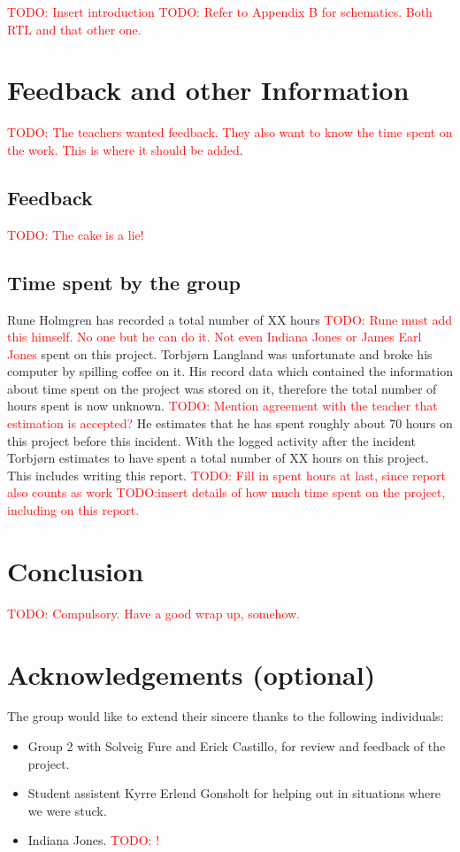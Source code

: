 \documentclass[a4paper]{IEEEtran}
\newcommand\TODO[1]{\textcolor{red}{TODO:#1}}
\newcommand\todo[1]{\TODO{#1}}
\begin{document}
\break
\todo{ Insert introduction }
\break
\break
\todo{ Refer to Appendix B for schematics. Both RTL and that other one. }

\section{Feedback and other Information}
\todo{ The teachers wanted feedback. They also want to know the time spent on the work. This is where it should be added}.
\subsection{Feedback}
\todo{ The cake is a lie!}

\subsection{Time spent by the group}
Rune Holmgren has recorded a total number of XX hours \todo{ Rune must add this himself. No one but he can do it. Not even Indiana Jones or James Earl Jones} spent on this project.
\break
Torbjørn Langland was unfortunate and broke his computer by spilling coffee on it.
His record data which contained the information about time spent on the project was stored on it, therefore the total number of hours spent is now unknown.
\todo{ Mention agreement with the teacher that estimation is accepted?}
He estimates that he has spent roughly about 70 hours on this project before this incident.
With the logged activity after the incident Torbjørn estimates to have spent a total number of XX hours on this project.
This includes writing this report.
\todo{ Fill in spent hours at last, since report also counts as work}
\todo{insert details of how much time spent on the project, including on this report.}

\section{Conclusion}
\todo{ Compulsory. Have a good wrap up, somehow. }

\section{Acknowledgements (optional)}
The group would like to extend their sincere thanks to the following individuals:
\begin{itemize}
    \item Group 2 with Solveig Fure and Erick Castillo, for review and feedback of the project.
    \item Student assistent Kyrre Erlend Gonsholt for helping out in situations where we were stuck.
    \item Indiana Jones. \todo{ ! }
\end{itemize}
\end{document}
